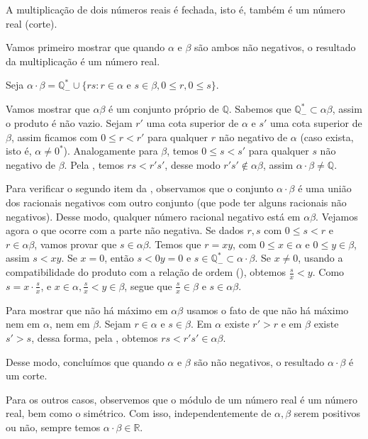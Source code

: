 \documentclass[../main.tex]{subfiles}
\begin{document}
\begin{prop}\label{reais-prop-produtoFechado}
    A multiplicação de dois números reais é fechada, isto é, também é um número real (corte).
\end{prop}
\begin{dem}
    Vamos primeiro mostrar que quando $\alpha$ e $\beta$ são ambos não negativos, o resultado da multiplicação é um número real. 

    Seja $\alpha \cdot \beta = \mathbb{Q}^*_{-} \cup \{ rs : r \in \alpha \text{ e } s \in \beta, 0 \leq r, 0 \leq s \}$.
    
    Vamos mostrar que $\alpha\beta$ é um conjunto próprio de $\mathbb{Q}$. Sabemos que $\mathbb{Q}^*_{-} \subset \alpha \beta$, assim o produto é não vazio. Sejam $r'$ uma cota superior de $\alpha$ e $s'$ uma cota superior de $\beta$, assim ficamos com $0 \leq r < r'$ para qualquer $r$ não negativo de $\alpha$ (caso exista, isto é, $\alpha \neq 0^*$). Analogamente para $\beta$, temos $0 \leq s < s'$ para qualquer $s$ não negativo de $\beta$. Pela , temos $rs < r's'$, desse modo $r's' \not\in \alpha \beta$, assim $\alpha \cdot \beta \neq \mathbb{Q}$.

    Para verificar o segundo item da , observamos que o conjunto $\alpha \cdot \beta$ é uma união dos racionais negativos com outro conjunto (que pode ter alguns racionais não negativos). Desse modo, qualquer número racional negativo está em $\alpha \beta$. Vejamos agora o que ocorre com a parte não negativa. Se dados $r,s$ com $0 \leq s < r$ e $r \in \alpha \beta$, vamos provar que  $s \in \alpha \beta$. Temos que $r = xy$, com $0 \leq x \in \alpha$ e $0 \leq y \in \beta$, assim $s < xy$. Se $x = 0$, então $s < 0y = 0$ e $s \in \mathbb{Q}_{-}^* \subset \alpha \cdot \beta$. Se $x \neq 0$, usando a compatibilidade do produto com a relação de ordem (), obtemos $\frac{s}{x} < y$. Como $s = x \cdot \frac{s}{x}$, e $x \in \alpha, \frac{s}{x} < y \in \beta$, segue que $\frac{s}{x} \in \beta$ e $s \in \alpha \beta$.    

    Para mostrar que não há máximo em $\alpha \beta$ usamos o fato de que não há máximo nem em $\alpha$, nem em $\beta$. Sejam $r \in \alpha$ e $s \in \beta$. Em $\alpha$ existe $r' > r$ e em $\beta$ existe $s' > s$, dessa forma, pela , obtemos $rs < r's'  \in \alpha \beta$.

    Desse modo, concluímos que quando $\alpha$ e $\beta$ são não negativos, o resultado $\alpha \cdot \beta$ é um corte.

    Para os outros casos, observemos que o módulo de um número real é um número real, bem como o simétrico. Com isso, independentemente de $\alpha, \beta$ serem positivos ou não, sempre temos $\alpha \cdot \beta \in \mathbb{R}$.
\end{dem}
\end{document}
